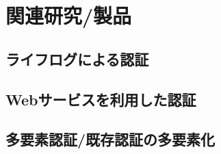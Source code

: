 \chapter{関連研究/製品}\label{chap:relatedwork}

\section{ライフログによる認証}
\section{Webサービスを利用した認証}
\section{多要素認証/既存認証の多要素化}

\newpage
